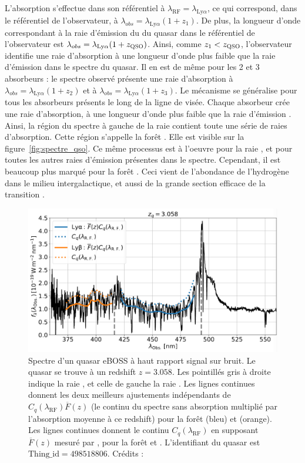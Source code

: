L'absorption \lya{} s'effectue dans son référentiel à $\lambda_{\mathrm{RF}} = \lambda_{\mathrm{Ly}\alpha}$, ce qui correspond, dans le référentiel de l'observateur, à $\lambda_{obs} = \lambda_{\mathrm{Ly}\alpha} (1+z_{1})$. De plus, la longueur d'onde correspondant à la raie d'émission du \lya{} du quasar dans le référentiel de l'observateur est $\lambda_{obs} = \lambda_{\mathrm{Ly}\alpha} (1+z_{\textsc{QSO}})$. Ainsi, comme $z_1 < z_{\textsc{QSO}}$, l'observateur identifie une raie d'absorption à une longueur d'onde plus faible que la raie d'émission \lya{} dans le spectre du quasar. Il en est de même pour les 2 et 3 absorbeurs : le spectre observé présente une raie d'absorption à $\lambda_{obs} = \lambda_{\mathrm{Ly}\alpha} (1+z_{2})$ et à $\lambda_{obs} = \lambda_{\mathrm{Ly}\alpha} (1+z_{3})$. Le mécanisme se généralise pour tous les absorbeurs présents le long de la ligne de visée. Chaque absorbeur crée une raie d'absorption, à une longueur d'onde plus faible que la raie d'émission \lya{}. Ainsi, la région du spectre à gauche de la raie \lya{} contient toute une série de raies d'absorption. Cette région s'appelle la forêt \lya{}. Elle est visible sur la figure~\ref{fig:spectre_qso}. Ce même processus est à l'oeuvre pour la raie \lyb{}, et pour toutes les autres raies d'émission présentes dans le spectre.
Cependant, il est beaucoup plus marqué pour la forêt \lya{}. Ceci vient de l'abondance de l'hydrogène dans le milieu intergalactique, et aussi de la grande section efficace de la transition \lya{}.
\begin{figure}
  \centering
  \includegraphics[scale=0.35]{foret_lya}
  \caption{Spectre d'un quasar eBOSS à haut rapport signal sur bruit. Le quasar se trouve à un redshift $z=3.058$.
    Les pointillés gris à droite indique la raie \lya{}, et celle de gauche la raie \lyb{}.
    Les lignes continues donnent les deux meilleurs ajustements indépendants de $C_{q}(\lambda_{\mathrm{RF}})\overline F(z)$ (le continu du spectre sans absorption multiplié par l'absorption moyenne à ce redshift) pour la forêt \lya (bleu) et \lyb{} (orange).
    Les lignes continues donnent le continu $C_{q}(\lambda_{\mathrm{RF}})$ en supposant $\overline F(z)$ mesuré par \textcite{Calura2012}, pour la forêt \lya{} et \lyb{}. L'identifiant du quasar est $\mathrm{Thing\_id} = 498518806$.
  Crédits : \textcite{DuMasdesBourboux2020}}
  \label{fig:foret_lya}
\end{figure}
